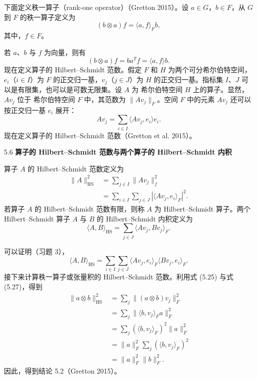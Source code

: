 下面定义秩一算子（rank-one operator）（Gretton 2015）。设 $a\in G$，$b\in F$，从 $G$ 到 $F$ 的秩一算子定义为
\begin{equation}
(b\otimes a)f=\langle a,f\rangle_Fb,
\tag{5.25}
\end{equation}
其中，$f\in F$。

若 $a$、$b$ 与 $f$ 为向量，则有
\[
(b\otimes a)f=ba^Tf=\langle a,f\rangle b.
\]
现在定义算子的 Hilbert–Schmidt 范数。假定 $F$ 和 $H$ 为两个可分希尔伯特空间，$e_i$（$i\in I$）为 $F$ 的正交归一基，$v_j$（$j\in J$）为 $H$ 的正交归一基。指标集 $I$、$J$ 可以是有限集，也可以是可数无限集。设 $A$ 为 希尔伯特空间 $H$ 上的算子。显然，$Av_j$ 位于 希尔伯特空间 $F$ 中，其范数为 $\lVert Av_j\rVert_F$。空间 $F$ 中的元素 $Av_j$ 还可以按正交归一基 $e_i$ 展开：
\begin{equation}
Av_j=\sum_{i\in I}\langle Av_j,e_i\rangle e_i.
\tag{5.26}
\end{equation}
现在定义算子的 Hilbert–Schmidt 范数（Gretton et al. 2015）。

\begin{bookdefinition}{5.6}
\textbf{算子的 Hilbert–Schmidt 范数与两个算子的 Hilbert–Schmidt 内积}

算子 $A$ 的 Hilbert–Schmidt 范数定义为
\begin{equation}
\begin{aligned}
\lVert A\rVert_{\mathrm{HS}}^2
&=\sum_{j\in I}\lVert Av_j\rVert_f^2\\
&=\sum_{i\in I}\sum_{j\in J}|\langle Av_j,e_i\rangle_F|^2.
\end{aligned}
\tag{5.27}
\end{equation}
若算子 $A$ 的 Hilbert–Schmidt 范数有限，则称 $A$ 为 Hilbert–Schmidt 算子。两个 Hilbert–Schmidt 算子 $A$ 与 $B$ 的 Hilbert–Schmidt 内积定义为
\begin{equation}
\langle A,B\rangle_{\mathrm{HS}}=\sum_{j\in J}\langle Av_j,Bv_j\rangle_F.
\tag{5.28}
\end{equation}
\end{bookdefinition}

可以证明（习题 3），
\begin{equation}
\langle A,B\rangle_{\mathrm{HS}}
=\sum_{i\in I}\sum_{j\in J}\langle Av_j,e_i\rangle_F\langle Bv_j,e_i\rangle_F.
\tag{5.29}
\end{equation}
接下来计算秩一算子或张量积的 Hilbert–Schmidt 范数。利用式 (5.25) 与式 (5.27)，得到
\begin{equation}
\begin{aligned}
\lVert a\otimes b\rVert_{\mathrm{HS}}^2
&=\sum_j\lVert(a\otimes b)v_j\rVert_F^2\\
&=\sum_j\lVert\langle b,v_j\rangle_Fa\rVert_F^2\\
&=\sum_j(\langle b,v_j\rangle_F)^2\lVert a\rVert_F^2\\
&=\lVert a\rVert_F^2\sum_j(\langle b,v_j\rangle_F)^2\\
&=\lVert a\rVert_F^2\lVert b\rVert_F^2.
\end{aligned}
\tag{5.30}
\end{equation}
因此，得到结论 5.2（Gretton 2015）。

